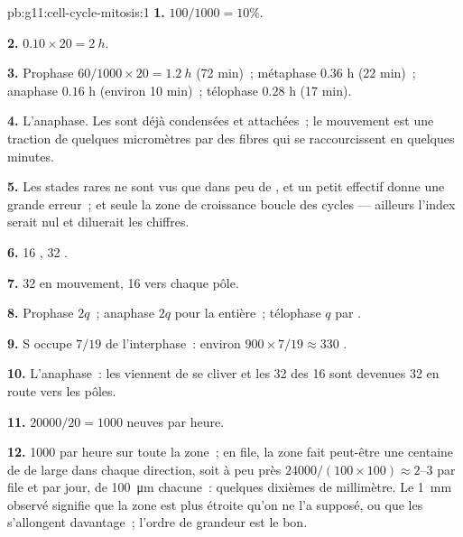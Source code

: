 \begin{solution}{pb:g11:cell-cycle-mitosis:1}
\textbf{1.} $100/1000 = 10\%$.

\textbf{2.} $0.10 \times 20 = \qty{2}{h}$.

\textbf{3.} Prophase $60/1000 \times 20 = \qty{1.2}{h}$ (72 min)~;
métaphase $0.36$ h (22 min)~; anaphase $0.16$ h (environ 10 min)~;
télophase $0.28$ h (17 min).

\textbf{4.} L'anaphase. Les  sont déjà condensées et
attachées~; le mouvement est une traction de quelques micromètres par
des fibres qui se raccourcissent en quelques minutes.

\textbf{5.} Les stades rares ne sont vus que dans peu de , et
un petit effectif donne une grande erreur~; et seule la zone de
croissance boucle des cycles --- ailleurs l'index serait nul et
diluerait les chiffres.

\textbf{6.} 16 , 32 .

\textbf{7.} 32  en mouvement, 16 vers chaque pôle.

\textbf{8.} Prophase $2q$~; anaphase $2q$ pour la  entière~;
télophase $q$ par .

\textbf{9.} S occupe $7/19$ de l'interphase~: environ $900 \times 7/19 \approx
330$ .

\textbf{10.} L'anaphase~: les  viennent de se cliver et les
32  des 16  sont devenues 32  en route
vers les pôles.

\textbf{11.} $\num{20000}/20 = 1000$  neuves par heure.

\textbf{12.} 1000  par heure sur toute la zone~; en file, la
zone fait peut-être une centaine de  de large dans chaque
direction, soit à peu près
$\num{24000}/(100 \times 100) \approx 2$--3  par file et par
jour, de \qty{100}{\micro m} chacune~: quelques dixièmes de
millimètre. Le \qty{1}{mm} observé signifie que la zone est plus
étroite qu'on ne l'a supposé, ou que les  s'allongent
davantage~; l'ordre de grandeur est le bon.


\end{solution}

